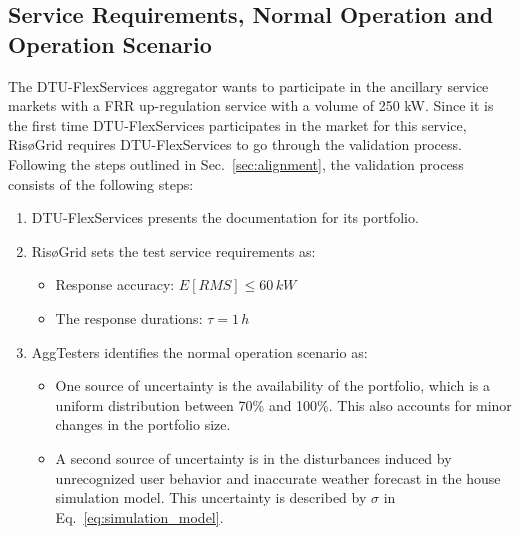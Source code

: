 \subsection{Service Requirements, Normal Operation and Operation Scenario}\label{subsec:scenario}
The DTU-FlexServices aggregator wants to participate in the ancillary service markets with a FRR up-regulation service with a volume of 250 kW. 
Since it is the first time DTU-FlexServices participates in the market for this service, RisøGrid requires DTU-FlexServices to go through the validation process. Following the steps outlined in Sec.~\ref{sec:alignment}, the validation process consists of the following steps:
\begin{enumerate}
\item DTU-FlexServices presents the documentation for its portfolio.
\item RisøGrid sets the test service requirements as:
    \begin{itemize}
        \item Response accuracy:  $E[RMS] \leq 60\,kW$
        \item The response durations: $\tau = 1\,h$
    \end{itemize}
\item AggTesters identifies the normal operation scenario as:
    \begin{itemize}
        \item One source of uncertainty is the availability of the portfolio, which is a uniform distribution between 70\% and 100\%. This also accounts for minor changes in the portfolio size.
        \item A second source of uncertainty is in the disturbances induced by unrecognized user behavior and inaccurate weather forecast in the house simulation model. This uncertainty is described by $\sigma$ in Eq.~\eqref{eq:simulation_model}.
    \end{itemize}
\end{enumerate}


